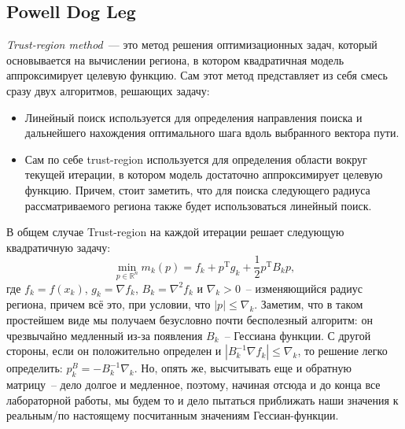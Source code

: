 \documentclass[12pt, a4paper, oneside, final]{article}
\begin{document}
	\subsection*{Powell Dog Leg}
	\textit{Trust-region method}~--- это метод решения оптимизационных задач, который основывается на вычислении региона, в котором квадратичная модель аппроксимирует целевую функцию.
	Сам этот метод представляет из себя смесь сразу двух алгоритмов, решающих задачу:
	\begin{itemize}
		\item Линейный поиск используется для определения направления поиска и дальнейшего нахождения оптимального шага вдоль выбранного вектора пути.
		\item Сам по себе trust-region используется для определения области вокруг текущей итерации, в котором модель достаточно аппроксимирует целевую функцию. Причем, стоит заметить, что для поиска следующего радиуса рассматриваемого региона также будет использоваться линейный поиск.
	\end{itemize}
	В общем случае Trust-region на каждой итерации решает следующую квадратичную задачу:
	\[
		\min_{p \in \mathbb{R}^{n}}{m_{k}(p)} = f_{k} + p^{\mathrm{T}}g_{k} + \dfrac{1}{2}p^{\mathrm{T}}B_{k}p,
	\] где $f_{k} = f(x_{k})$, $g_{k} = \nabla{f_{k}}$, $B_{k} = \nabla^{2}{f_{k}}$ и $\nabla_{k} > 0$~-- изменяющийся радиус региона, причем всё это, при условии, что $|p| \leqslant \nabla_{k}$.
	Заметим, что в таком простейшем виде мы получаем безусловно почти бесполезный алгоритм: он чрезвычайно медленный из-за появления $B_{k}$~-- Гессиана функции.
	С другой стороны, если он положительно определен и $|B_{k}^{-1}\nabla{f_{k}}| \leqslant \nabla_{k}$, то решение легко определить: $p_{k}^{B} = -B_{k}^{-1}\nabla_{k}$.
	Но, опять же, высчитывать еще и обратную матрицу~-- дело долгое и медленное, поэтому, начиная отсюда и до конца все лабораторной работы, мы будем то и дело пытаться приближать наши значения к реальным/по настоящему посчитанным значениям Гессиан-функции.
\end{document}
